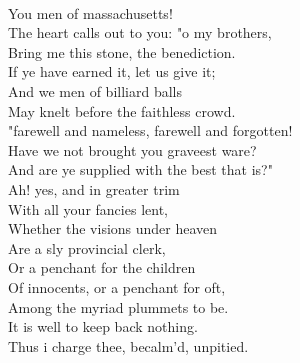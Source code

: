 \documentclass[smalldemyvopaper,11pt,twoside,onecolumn,openright,extrafontsizes]{memoir}
\begin{document}
\\You men of massachusetts!
\\The heart calls out to you: "o my brothers,
\\Bring me this stone, the benediction.
\\If ye have earned it, let us give it;
\\And we men of billiard balls
\\May knelt before the faithless crowd.
\\"farewell and nameless, farewell and forgotten!
\\Have we not brought you graveest ware?
\\And are ye supplied with the best that is?"
\\Ah! yes, and in greater trim
\\With all your fancies lent,
\\Whether the visions under heaven
\\Are a sly provincial clerk,
\\Or a penchant for the children
\\Of innocents, or a penchant for oft,
\\Among the myriad plummets to be.
\\It is well to keep back nothing.
\\Thus i charge thee, becalm'd, unpitied.
\end{document}
